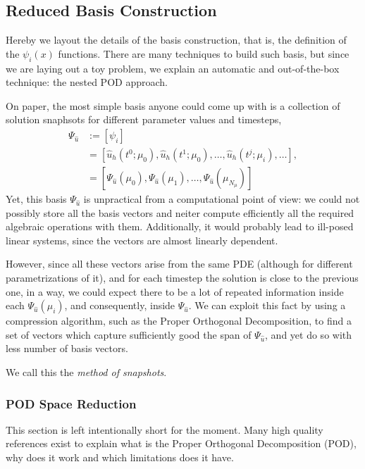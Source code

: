 \documentclass[../1_heat_equation.tex]{subfiles}
\begin{document}
\subsection{Reduced Basis Construction}
\label{sec:1d_rom_heat_equation_basis_construction}
Hereby we layout the details of the basis construction, that is, the definition of the $\psi_i(x)$ functions.
There are many techniques to build such basis, but since we are laying out a toy problem, we explain an automatic and out-of-the-box technique: the nested POD approach. 

On paper, the most simple basis anyone could come up with is a collection of solution snaphsots for different parameter values and timesteps, 
\begin{align}
    \Psi_{\hat{u}} &:= [\psi_i] \nonumber \\
    &= [\hat{u}_h(t^0; \mu_0), \hat{u}_h(t^1; \mu_0), 
    \ldots, \hat{u}_h(t^j; \mu_i), \ldots], \nonumber \\
    &= [\Psi_{\hat{u}}(\mu_0), \Psi_{\hat{u}}(\mu_1), \ldots, \Psi_{\hat{u}}(\mu_{N_{\mu}})]
\end{align}
Yet, this basis $\Psi_{\hat{u}}$ is unpractical from a computational point of view: we could not possibly store all the basis vectors and neiter compute efficiently all the required algebraic operations with them.
Additionally, it would probably lead to ill-posed linear systems, since the vectors are almost linearly dependent. 

However, since all these vectors arise from the same PDE (although for different parametrizations of it), and for each timestep the solution is close to the previous one, in a way, we could expect there to be a lot of repeated information inside each $\Psi_{\hat{u}}(\mu_i)$, and consequently, inside $\Psi_{\hat{u}}$.
We can exploit this fact by using a compression algorithm, such as the Proper Orthogonal Decomposition, to find a set of vectors which capture sufficiently good the span of $\Psi_{\hat{u}}$, and yet do so with less number of basis vectors. 

We call this the \emph{method of snapshots}. 

\subsubsection{POD Space Reduction}
\label{sec:1d_rom_heat_equation_basis_construction_pod}
This section is left intentionally short for the moment.
Many high quality references exist to explain what is the Proper Orthogonal Decomposition (POD), why does it work and which limitations does it have.
\end{document}
